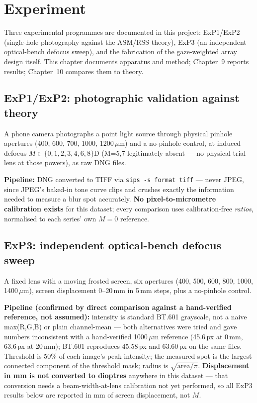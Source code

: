 \documentclass[11pt]{report}
\begin{document}
\chapter{Experiment}

Three experimental programmes are documented in this project: ExP1/ExP2 (single-hole
photography against the ASM/RSS theory), ExP3 (an independent optical-bench defocus sweep),
and the fabrication of the gaze-weighted array design itself. This chapter documents
apparatus and method; Chapter~9 reports results; Chapter~10 compares them to theory.

\section{ExP1/ExP2: photographic validation against theory}

A phone camera photographs a point light source through physical pinhole apertures (400,
600, 700, 1000, 1200\,$\mu$m) and a no-pinhole control, at induced defocus
$M\in\{0,1,2,3,4,6,8\}$D (M=5,7 legitimately absent --- no physical trial lens at those
powers), as raw DNG files.

\textbf{Pipeline:} DNG converted to TIFF via \texttt{sips -s format tiff} --- never JPEG,
since JPEG's baked-in tone curve clips and crushes exactly the information needed to
measure a blur spot accurately. \textbf{No pixel-to-micrometre calibration exists} for this
dataset; every comparison uses calibration-free \emph{ratios}, normalised to each series'
own $M=0$ reference.

\section{ExP3: independent optical-bench defocus sweep}

A fixed lens with a moving frosted screen, six apertures (400, 500, 600, 800, 1000,
1400\,$\mu$m), screen displacement 0--20\,mm in 5\,mm steps, plus a no-pinhole control.

\textbf{Pipeline (confirmed by direct comparison against a hand-verified reference, not
assumed):} intensity is standard BT.601 grayscale, not a naive max(R,G,B) or plain
channel-mean --- both alternatives were tried and gave numbers inconsistent with a
hand-verified 1000\,$\mu$m reference (45.6\,px at 0\,mm, 63.6\,px at 20\,mm); BT.601
reproduces 45.58\,px and 63.60\,px on the same files. Threshold is 50\% of each image's
peak intensity; the measured spot is the largest connected component of the threshold mask;
radius is $\sqrt{\text{area}/\pi}$. \textbf{Displacement in mm is not converted to
dioptres} anywhere in this dataset --- that conversion needs a beam-width-at-lens
calibration not yet performed, so all ExP3 results below are reported in mm of screen
displacement, not $M$.
\end{document}
